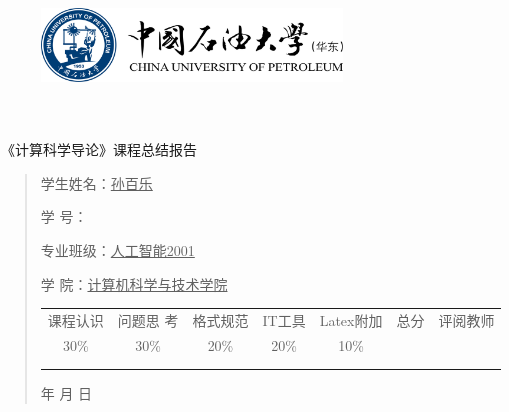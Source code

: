 \documentclass{article}
\renewcommand{\today}{\number\year 年 \number\month 月 \number\day 日}
\begin{document}
\begin{figure}
    \centering
    \includegraphics[width=8cm]{upc.png}

    \label{figupc}
\end{figure}

	\begin{center}
		\quad \\
		\quad \\
		\heiti \fontsize{45}{17} \quad \quad \quad 
		\vskip 1.5cm
		\heiti {} 《计算科学导论》课程总结报告
	\end{center}
	\vskip 2.0cm
		
	\begin{quotation}
		\doublespacing
		
        \par\setlength\parindent{7em}
		\quad 

		学生姓名：\underline{\qquad  孙百乐 \qquad \qquad}

		学\hspace{0.61cm} 号：\underline{\qquad}
		
		专业班级：\underline{\qquad 人工智能2001 \qquad  }
		
        学\hspace{0.61cm} 院：\underline{计算机科学与技术学院}
		\vskip 2cm
		\centering
		\begin{table}[h]
            \centering 
            \begin{tabular}{|c|c|c|c|c|c|c|}
                \hline
                课程认识 & 问题思 考 & 格式规范  & IT工具  & Latex附加  & 总分 & 评阅教师 \\
                30\% & 30\% & 20\% & 20\% & 10\% &  &  \\
                \hline
                 & & & & & &\\
                & & & & & &\\
                \hline
            \end{tabular}
        \end{table}
		\vskip 2cm
		\today
	\end{quotation}
\end{document}
